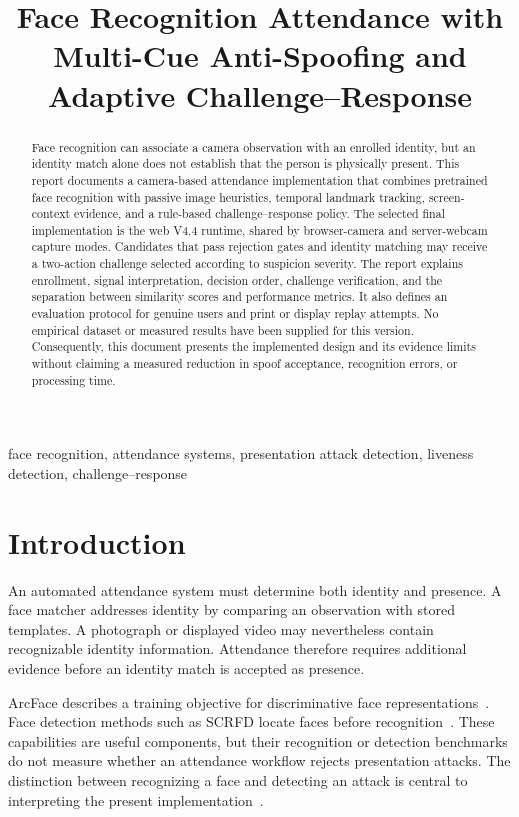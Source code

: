 \documentclass[conference,a4paper]{IEEEtran}
\title{Face Recognition Attendance with Multi-Cue Anti-Spoofing and Adaptive Challenge--Response}
\author{\IEEEauthorblockN{Vo Minh Sang}}
\begin{document}
\maketitle

\begin{abstract}
Face recognition can associate a camera observation with an enrolled identity, but an identity match alone does not establish that the person is physically present. This report documents a camera-based attendance implementation that combines pretrained face recognition with passive image heuristics, temporal landmark tracking, screen-context evidence, and a rule-based challenge--response policy. The selected final implementation is the web V4.4 runtime, shared by browser-camera and server-webcam capture modes. Candidates that pass rejection gates and identity matching may receive a two-action challenge selected according to suspicion severity. The report explains enrollment, signal interpretation, decision order, challenge verification, and the separation between similarity scores and performance metrics. It also defines an evaluation protocol for genuine users and print or display replay attempts. No empirical dataset or measured results have been supplied for this version. Consequently, this document presents the implemented design and its evidence limits without claiming a measured reduction in spoof acceptance, recognition errors, or processing time.
\end{abstract}

\begin{IEEEkeywords}
face recognition, attendance systems, presentation attack detection, liveness detection, challenge--response
\end{IEEEkeywords}

\section{Introduction}
An automated attendance system must determine both identity and presence. A face matcher addresses identity by comparing an observation with stored templates. A photograph or displayed video may nevertheless contain recognizable identity information. Attendance therefore requires additional evidence before an identity match is accepted as presence.

ArcFace describes a training objective for discriminative face representations~\cite{arcface}. Face detection methods such as SCRFD locate faces before recognition~\cite{scrfd}. These capabilities are useful components, but their recognition or detection benchmarks do not measure whether an attendance workflow rejects presentation attacks. The distinction between recognizing a face and detecting an attack is central to interpreting the present implementation~\cite{padintro}.
\end{document}
